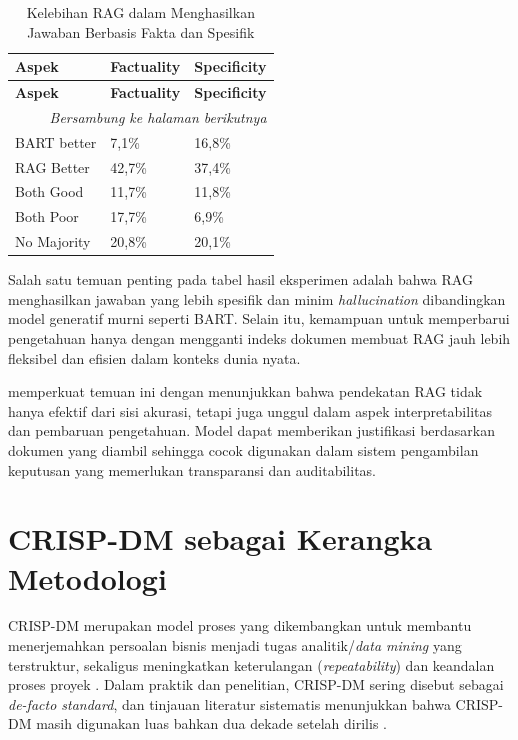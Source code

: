 \begin{longtable}{|p{3cm}|p{5cm}|p{5cm}|}
\caption{Kelebihan RAG dalam Menghasilkan Jawaban Berbasis Fakta dan Spesifik}
\label{tbl:Kelebihan RAG} \\
\hline
\textbf{Aspek} & \textbf{Factuality} & \textbf{Specificity} \\
\hline
\endfirsthead

\hline
\textbf{Aspek} & \textbf{Factuality} & \textbf{Specificity} \\
\hline
\endhead

\hline
\multicolumn{3}{r}{\textit{Bersambung ke halaman berikutnya}} \\
\endfoot

\hline
\endlastfoot

BART better
&
7,1\%
&
16,8\%
\\ \hline

RAG Better
&
42,7\%
&
37,4\%
\\ \hline

Both Good
&
11,7\%
&
11,8\%
\\ \hline

Both Poor
&
17,7\%
&
6,9\%
\\ \hline

No Majority
&
20,8\%
&
20,1\%
\\ \hline

\end{longtable}

Salah satu temuan penting pada tabel hasil eksperimen adalah bahwa RAG menghasilkan jawaban yang lebih spesifik dan minim \textit{hallucination} dibandingkan model generatif murni seperti BART. Selain itu, kemampuan untuk memperbarui pengetahuan hanya dengan mengganti indeks dokumen membuat RAG jauh lebih fleksibel dan efisien dalam konteks dunia nyata.

\textcite{Gao2024} memperkuat temuan ini dengan menunjukkan bahwa pendekatan RAG tidak hanya efektif dari sisi akurasi, tetapi juga unggul dalam aspek interpretabilitas dan pembaruan pengetahuan. Model dapat memberikan justifikasi berdasarkan dokumen yang diambil sehingga cocok digunakan dalam sistem pengambilan keputusan yang memerlukan transparansi dan auditabilitas.

\section{CRISP-DM sebagai Kerangka Metodologi}
CRISP-DM merupakan model proses yang dikembangkan untuk membantu menerjemahkan persoalan bisnis menjadi tugas analitik/\textit{data mining} yang terstruktur, sekaligus meningkatkan keterulangan (\textit{repeatability}) dan keandalan proses proyek \autocite{rudiger2000}. Dalam praktik dan penelitian, CRISP-DM sering disebut sebagai \textit{de-facto standard}, dan tinjauan literatur sistematis menunjukkan bahwa CRISP-DM masih digunakan luas bahkan dua dekade setelah dirilis \autocite{Schroer2021}.

